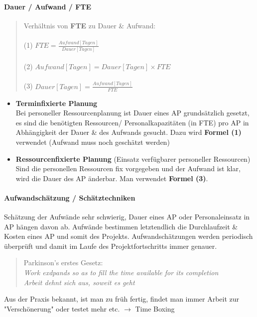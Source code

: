 \documentclass[a4paper]{article}
\begin{document}
			\paragraph{Dauer / Aufwand / FTE}
			
			\begin{quote}
				Verhältnis von \textbf{FTE} zu Dauer \& Aufwand:\\
				\\
				(1) $FTE = \frac{Aufwand[Tagen]}{Dauer[Tagen]}$\\
				\\
				(2) $Aufwand[Tagen] = Dauer[Tagen] \times FTE$\\
				\\
				(3) $Dauer[Tagen] = \frac{Aufwand[Tagen]}{FTE}$		
			\end{quote}
		
			\begin{itemize}
				\item \textbf{Terminfixierte Planung}\\
						Bei personeller Ressourcenplanung ist Dauer eines AP grundsätzlich gesetzt, es sind die benötigten Ressourcen/ Personalkapazitäten (in FTE) pro AP in Abhängigkeit der Dauer \& des Aufwands gesucht. Dazu wird \textbf{Formel (1)} verwendet (Aufwand muss noch geschätzt werden)
				\item \textbf{Ressourcenfixierte Planung} (Einsatz verfügbarer personeller Ressourcen)\\
						Sind die personellen Ressourcen fix vorgegeben und der Aufwand ist klar, wird die Dauer des AP änderbar. 
						Man verwendet \textbf{Formel (3)}.
			\end{itemize}
			
			\paragraph{Aufwandschätzung / Schätztechniken}
			
			Schätzung der Aufwände sehr schwierig, Dauer eines AP oder Personaleinsatz in AP hängen davon ab.
			Aufwände bestimmen letztendlich die Durchlaufzeit \& Kosten eines AP und somit des Projekts.
			Aufwandschätzungen werden periodisch überprüft und damit im Laufe des Projektfortschritts immer genauer.
			
			\begin{quote}
				Parkinson's erstes Gesetz:\\
				\textit{Work exdpands so as to fill the time available for its completion}\\
				\textit{Arbeit dehnt sich aus, soweit es geht}
			\end{quote}
			Aus der Praxis bekannt, ist man zu früh fertig, findet man immer Arbeit zur "Verschönerung" oder testet mehr etc. $\rightarrow$ Time Boxing
			
\end{document}
